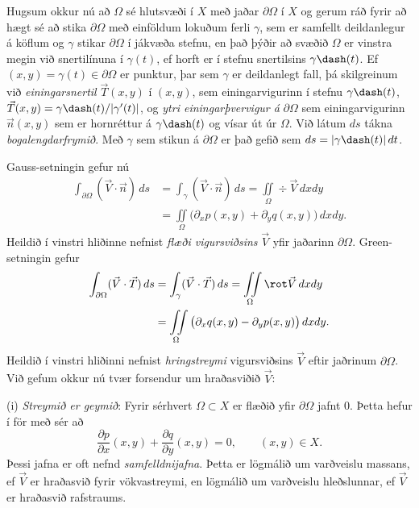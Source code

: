 Hugsum okkur nú að ${\Omega}$ sé hlutsvæði í $X$ með jaðar
${\partial} {\Omega}$ í $X$ og gerum ráð fyrir að hægt sé að stika
${\partial}{\Omega}$ með einföldum lokuðum ferli ${\gamma}$, sem er samfellt
deildanlegur á köflum og ${\gamma}$ stikar ${\partial}{\Omega}$ í
jákvæða stefnu, en það þýðir að svæðið ${\Omega}$ er vinstra megin við
snertilínuna í ${\gamma}(t)$, ef horft er í stefnu snertilsins
${\gamma}\dash(t)$. Ef $(x,y)={\gamma}(t)\in {\partial}{\Omega}$ er
punktur, þar sem ${\gamma}$ er deildanlegt fall, þá
skilgreinum við {\it einingarsnertil}
$\vec T(x,y)$ í $(x,y)$, sem einingarvigurinn í stefnu
${\gamma}\dash(t)$, $\vec T(x,y)={\gamma}\dash(t)/|{\gamma}'(t)|$,
og {\it ytri
einingarþvervigur á} ${\partial}{\Omega}$ sem
einingarvigurinn $\vec n(x,y)$ sem er hornréttur á
${\gamma}\dash(t)$ og vísar út úr ${\Omega}$. Við
látum $ds$ tákna {\it bogalengdarfrymið}.
Með ${\gamma}$ sem stikun á ${\partial}{\Omega}$ er það gefið sem
$ds=|{\gamma}\dash(t)|\, dt$.




\noindent
Gauss-setningin gefur nú
\begin{align*}
\int_{\partial\Omega}(\vec V\cdot\vec n)\, ds
&=\int_{{\gamma}}(\vec V\cdot\vec n)\, ds
=\iint\limits_{{\Omega}} \div \vec V\, dxdy\\
&=\iint\limits_{{\Omega}}
\big({\partial}_xp(x,y)+{\partial}_yq(x,y)\big)\, dxdy.\nonumber
\end{align*}
Heildið í vinstri hliðinne nefnist {\it flæði
vigursviðsins} $\vec
V$ yfir jaðarinn ${\partial}{\Omega}$.
Green-setningin gefur
\begin{align*}
\int_{\partial\Omega}(\vec V\cdot\vec T)\, ds
&=\int_{{\gamma}}(\vec V\cdot\vec T)\, ds
=\iint\limits_{{\Omega}} \rot \vec V\, dxdy\\
&=\iint\limits_{{\Omega}}
\big({\partial}_xq(x,y)-{\partial}_yp(x,y)\big)\, dxdy.\nonumber
\end{align*}
Heildið í vinstri hliðinni  nefnist 
{\it hringstreymi} vigursviðsins $\vec V$ eftir jaðrinum
${\partial}{\Omega}$.  
Við gefum okkur nú tvær forsendur um hraðasviðið $\vec V$:

\smallskip\noindent
(i) {\it Streymið er geymið}:  Fyrir sérhvert ${\Omega}\subset X$ er
flæðið yfir ${\partial}{\Omega}$ jafnt $0$.  Þetta hefur
í för með sér að
\begin{equation*}
\dfrac{\partial p}{\partial x}(x,y)+
\dfrac{\partial q}{\partial y}(x,y)=0, \qquad (x,y)\in X.
\label{4.7.5}
\end{equation*}
Þessi jafna er oft nefnd {\it
samfelldnijafna}. 
Þetta er lögmálið um varðveislu massans, ef $\vec V$ er hraðasvið fyrir
vökvastreymi, en lögmálið um varðveislu hleðslunnar, ef $\vec V$ er
hraðasvið rafstraums.  

